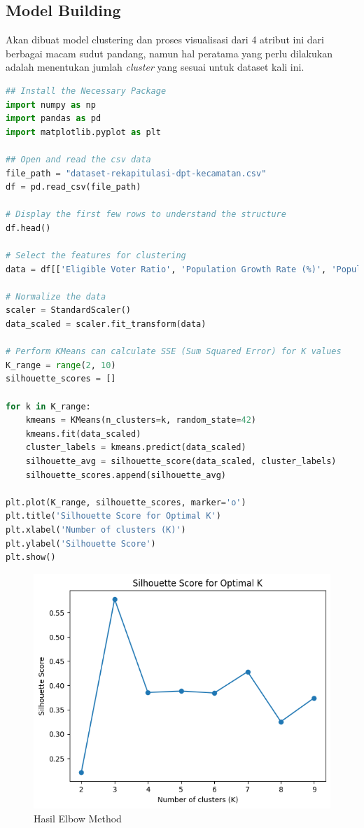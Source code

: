 \subsection{Model Building}
Akan dibuat model clustering dan proses visualisasi dari 4 atribut ini dari berbagai macam sudut pandang, namun hal peratama yang perlu dilakukan adalah menentukan jumlah \textit{cluster} yang sesuai untuk dataset kali ini.

\begin{lstlisting}[language=Python, caption=Python Code for Elbow Methods,label={lst:elbow_method}]
## Install the Necessary Package
import numpy as np
import pandas as pd
import matplotlib.pyplot as plt

## Open and read the csv data
file_path = "dataset-rekapitulasi-dpt-kecamatan.csv"
df = pd.read_csv(file_path)

# Display the first few rows to understand the structure
df.head()

# Select the features for clustering
data = df[['Eligible Voter Ratio', 'Population Growth Rate (%)', 'Population Density', 'Voter Gender Ratio']]

# Normalize the data
scaler = StandardScaler()
data_scaled = scaler.fit_transform(data)

# Perform KMeans can calculate SSE (Sum Squared Error) for K values
K_range = range(2, 10)
silhouette_scores = []

for k in K_range:
    kmeans = KMeans(n_clusters=k, random_state=42)
    kmeans.fit(data_scaled)
    cluster_labels = kmeans.predict(data_scaled)
    silhouette_avg = silhouette_score(data_scaled, cluster_labels)
    silhouette_scores.append(silhouette_avg)

plt.plot(K_range, silhouette_scores, marker='o')
plt.title('Silhouette Score for Optimal K')
plt.xlabel('Number of clusters (K)')
plt.ylabel('Silhouette Score')
plt.show()
\end{lstlisting}

\begin{figure}[h]
    \centering
    \includegraphics[width=0.5\linewidth]{images/optimal_cluster.png}
    \caption{Hasil Elbow Method}
    \label{fig:elbow_method}
\end{figure}

